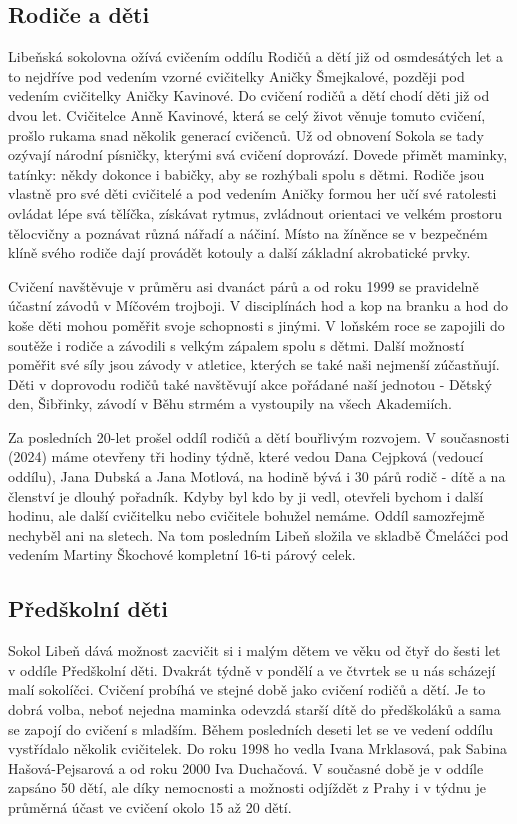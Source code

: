 \subsection{Rodiče a děti}\label{rodiux10de-a-dux11bti}

Libeňská sokolovna ožívá cvičením oddílu Rodičů a dětí již od
osmdesátých let a to nejdříve pod vedením vzorné cvičitelky Aničky
Šmejkalové, později pod vedením cvičitelky Aničky Kavinové. Do cvičení
rodičů a dětí chodí děti již od dvou let. Cvičitelce Anně Kavinové,
která se celý život věnuje tomuto cvičení, prošlo rukama snad několik
generací cvičenců. Už od obnovení Sokola se tady ozývají národní
písničky, kterými svá cvičení doprovází. Dovede přimět maminky, tatínky:
někdy dokonce i babičky, aby se rozhýbali spolu s dětmi. Rodiče jsou
vlastně pro své děti cvičitelé a pod vedením Aničky formou her učí své
ratolesti ovládat lépe svá tělíčka, získávat rytmus, zvládnout orientaci
ve velkém prostoru tělocvičny a poznávat různá nářadí a náčiní. Místo na
žíněnce se v bezpečném klíně svého rodiče dají provádět kotouly a další
základní akrobatické prvky.

Cvičení navštěvuje v průměru asi dvanáct párů a od roku 1999 se
pravidelně účastní závodů v Míčovém trojboji. V disciplínách hod a kop
na branku a hod do koše děti mohou poměřit svoje schopnosti s jinými. V
loňském roce se zapojili do soutěže i rodiče a závodili s velkým zápalem
spolu s dětmi. Další možností poměřit své síly jsou závody v atletice,
kterých se také naši nejmenší zúčastňují. Děti v doprovodu rodičů také
navštěvují akce pořádané naší jednotou - Dětský den, Šibřinky, závodí v
Běhu strmém a vystoupily na všech Akademiích.

Za posledních 20-let prošel oddíl rodičů a dětí bouřlivým rozvojem. V
současnosti (2024) máme otevřeny tři hodiny týdně, které vedou Dana
Cejpková (vedoucí oddílu), Jana Dubská a Jana Motlová, na hodině bývá i
30 párů rodič - dítě a na členství je dlouhý pořadník. Kdyby byl kdo by
ji vedl, otevřeli bychom i další hodinu, ale další cvičitelku nebo
cvičitele bohužel nemáme. Oddíl samozřejmě nechyběl ani na sletech. Na
tom posledním Libeň složila ve skladbě Čmeláčci pod vedením Martiny
Škochové kompletní 16-ti párový celek.

\subsection{Předškolní děti}\label{pux159edux161kolnuxed-dux11bti}

Sokol Libeň dává možnost zacvičit si i malým dětem ve věku od čtyř do
šesti let v oddíle Předškolní děti. Dvakrát týdně v pondělí a ve čtvrtek
se u nás scházejí malí sokolíčci. Cvičení probíhá ve stejné době jako
cvičení rodičů a dětí. Je to dobrá volba, neboť nejedna maminka odevzdá
starší dítě do předškoláků a sama se zapojí do cvičení s mladším. Během
posledních deseti let se ve vedení oddílu vystřídalo několik cvičitelek.
Do roku 1998 ho vedla Ivana Mrklasová, pak Sabina Hašová-Pejsarová a od
roku 2000 Iva Duchačová. V současné době je v oddíle zapsáno 50 dětí,
ale díky nemocnosti a možnosti odjíždět z Prahy i v týdnu je průměrná
účast ve cvičení okolo 15 až 20 dětí.

